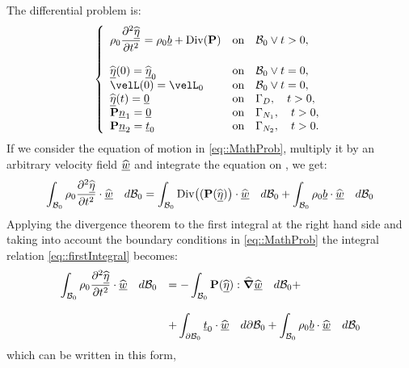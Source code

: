 The differential problem is:
\begin{equation} \left\{
    \begin{array}{lllllll} \displaystyle
      \rho_0\frac{\partial^2\displL}{\partial
        t^2}=\rho_0\underline{b}+\text{Div}(\Piola) & \text{on} \quad \RefConE
      \vee t>0,\\ \\ \displL(0)=\displL_0 & \text{on} \quad \RefConE \vee
      t=0,\\ \velL(0)=\velL_0 & \text{on} \quad \RefConE \vee t=0,\\
      \displL(t)=\underline{0} & \text{on} \quad \Gamma_D, \quad t>0,\\
      \Piola\underline{n}_1=\underline{0} & \text{on} \quad \Gamma_{N_1},
      \quad t>0,\\ \Piola\underline{n}_2=\underline{t}_0 & \text{on} \quad
      \Gamma_{N_2}, \quad t>0.\\
    \end{array}\right.
  \label{eq::MathProb}
\end{equation} If we consider the equation of motion in
\eqref{eq::MathProb}, multiply it by an arbitrary velocity field
$\widehat{\underline{w}}$ and integrate the equation on \RefCon, we get:
\begin{equation} \displaystyle \int_{\mathcal{B}_0}\rho_0\frac{\partial^2
    \widehat{\underline{\eta}}}{\partial t^2}\cdot\widehat{\underline{w}}\quad d\mathcal{B}_0 =
  \int_{\mathcal{B}_0}\text{Div}\big((\textbf{P}(\widehat{\underline{\eta}})\big)\cdot\widehat{\underline{w}}\quad d\mathcal{B}_0 +
  \int_{\mathcal{B}_0}\rho_0\underline{b}\cdot\widehat{\underline{w}}\quad d\mathcal{B}_0
  \label{eq::firstIntegral}
\end{equation} Applying the divergence theorem to the first integral
at the right hand side and taking into account the boundary conditions
in \eqref{eq::MathProb} the integral relation
\eqref{eq::firstIntegral} becomes:
\begin{equation}
  \begin{array}{lll} \displaystyle
    \int_{\mathcal{B}_0}\rho_0\frac{\partial^2 \widehat{\underline{\eta}}}{\partial
      t^2}\cdot\widehat{\underline{w}}\quad d\mathcal{B}_0 & = \displaystyle -
    \int_{\mathcal{B}_0}\textbf{P}(\widehat{\underline{\eta}}):\widehat{\boldsymbol{\nabla}}\widehat{\underline{w}}\quad d\mathcal{B}_0 + \\ \\ &
    \displaystyle + \int_{\partial
      \mathcal{B}_0}\underline{t}_0\cdot\widehat{\underline{w}}\quad d\partial\mathcal{B}_0 +
    \int_{\mathcal{B}_0}\rho_0 \underline{b}\cdot\widehat{\underline{w}}\quad d\mathcal{B}_0
  \end{array}
  \label{eq::secondIntegral}
\end{equation} which can be written in this form,
